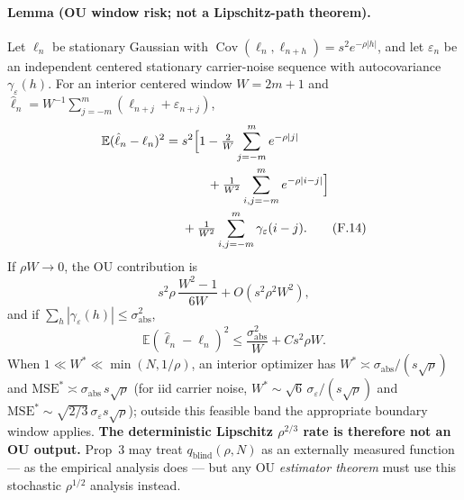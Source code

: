 \paragraph{Lemma (OU window risk; not a Lipschitz-path theorem).} Let $\ell_n$ be stationary Gaussian with $\operatorname{Cov}(\ell_n,\ell_{n+h})=s^2e^{-\rho|h|}$, and let $\varepsilon_n$ be an independent centered stationary carrier-noise sequence with autocovariance $\gamma_\varepsilon(h)$. For an interior centered window $W=2m+1$ and $\hat\ell_n=W^{-1}\sum_{j=-m}^m(\ell_{n+j}+\varepsilon_{n+j})$,
\begin{align}
\mathbb E(\hat\ell_n-\ell_n)^2
={}&s^2\Big[1-\tfrac2W\sum_{j=-m}^me^{-\rho|j|}\notag\\
&\qquad+\tfrac1{W^2}\sum_{i,j=-m}^me^{-\rho|i-j|}\Big]\notag\\
&+\tfrac1{W^2}\sum_{i,j=-m}^m\gamma_\varepsilon(i-j).
\tag{F.14}
\end{align}
If $\rho W\to0$, the OU contribution is
\begin{equation}
s^2\rho\,\frac{W^2-1}{6W}+O(s^2\rho^2W^2), \tag{F.15}
\end{equation}
and if $\sum_h|\gamma_\varepsilon(h)|\le\sigma_{\mathrm{abs}}^2$,
\begin{equation}
\mathbb E(\hat\ell_n-\ell_n)^2\le\frac{\sigma_{\mathrm{abs}}^2}{W}+Cs^2\rho W .
\tag{F.16}
\end{equation}
When $1\ll W^*\ll\min(N,1/\rho)$, an interior optimizer has $W^*\asymp\sigma_{\mathrm{abs}}/(s\sqrt\rho)$ and $\mathrm{MSE}^*\asymp\sigma_{\mathrm{abs}}\,s\sqrt\rho$ (for iid carrier noise, $W^*\sim\sqrt6\,\sigma_\varepsilon/(s\sqrt\rho)$ and $\mathrm{MSE}^*\sim\sqrt{2/3}\,\sigma_\varepsilon s\sqrt\rho$); outside this feasible band the appropriate boundary window applies. \textbf{The deterministic Lipschitz $\rho^{2/3}$ rate is therefore not an OU output.} Prop~3 may treat $q_{\mathrm{blind}}(\rho,N)$ as an externally measured function --- as the empirical analysis does --- but any OU \emph{estimator theorem} must use this stochastic $\rho^{1/2}$ analysis instead.

